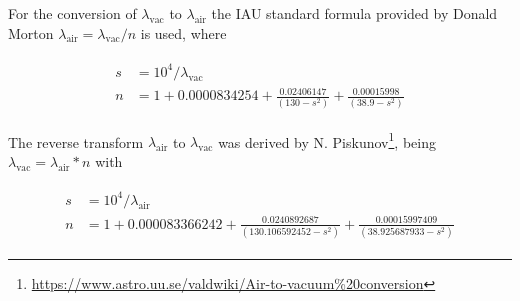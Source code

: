 For the conversion of $\lambda_\textrm{vac}$ to $\lambda_\textrm{air}$ the \ac{IAU} standard formula provided by Donald Morton \cite{mor00} $\lambda_\textrm{air}=\lambda_\textrm{vac}/n$ is used, where

\begin{eqnarray}\label{eq:air2vac}
\left.\begin{aligned}
    s &=10^4 / \lambda_{\textrm{vac}}\\
    n &= 1+0.0000834254 + \frac{0.02406147}{(130 - s^2)} + \frac{0.00015998}{(38.9 - s^2)}
\end{aligned}\right.
\end{eqnarray}

The reverse transform $\lambda_\textrm{air}$ to $\lambda_\textrm{vac}$ was derived by N. Piskunov\footnote{\url{https://www.astro.uu.se/valdwiki/Air-to-vacuum\%20conversion}}, being $\lambda_\textrm{vac}=\lambda_\textrm{air}*n$ with 

\begin{eqnarray}\label{eq:vac2air}
\left.\begin{aligned}
    s&=10^4 / \lambda_{\textrm{air}}\\
    n&=1 + 0.000083366242 + \frac{0.0240892687}{(130.106592452 - s^2)} + \frac{0.00015997409}{(38.925687933 - s^2)}
\end{aligned}\right.
\end{eqnarray}

